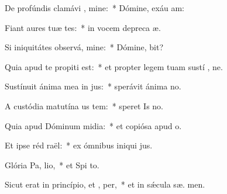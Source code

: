 \item De profúndis clamávi  , mine:~* Dómine, exáu  am:
\item Fiant aures tuæ tes:~* in vocem depreca æ.
\item Si iniquitátes observá, mine:~* Dómine,  bit?
\item Quia apud te propiti est:~* et propter legem tuam sustí , ne.
\item Sustínuit ánima mea in  jus:~* sperávit ánima   no.
\item A custódia matutína us  tem:~* speret Is  no.
\item Quia apud Dóminum midia:~* et copiósa apud  o.
\item Et ipse réd raël:~* ex ómnibus iniqui jus.
\item Glória Pa,  lio,~* et Spi to.
\item Sicut erat in princípio, et ,  per,~* et in sǽcula sæ. men.
